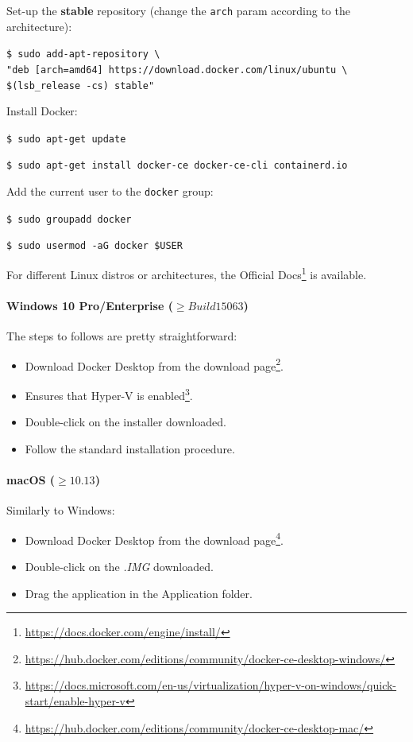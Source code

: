 \noindent Set-up the \textbf{stable} repository (change the \texttt{arch} param according to the architecture):

  \texttt{\$ sudo add-apt-repository \textbackslash} \\
  \indent \hspace{0.8cm} \texttt{"deb [arch=amd64] https://download.docker.com/linux/ubuntu \textbackslash} \\
  \indent \hspace{0.8cm} \texttt{\$(lsb\_release -cs) stable"}

\noindent Install Docker:

  \texttt{\$ sudo apt-get update}
  
  \texttt{\$ sudo apt-get install docker-ce docker-ce-cli containerd.io}

\noindent Add the current user to the \texttt{docker} group:
  
  \texttt{\$ sudo groupadd docker}
  
  \texttt{\$ sudo usermod -aG docker \$USER}

\noindent For different Linux distros or architectures, the Official Docs\footnote{\url{https://docs.docker.com/engine/install/}} is available.

\paragraph{Windows 10 Pro/Enterprise ($\geq Build 15063$)} The steps to follows are pretty straightforward:

\begin{itemize}
    \item[1.] Download Docker Desktop from the download page\footnote{\url{https://hub.docker.com/editions/community/docker-ce-desktop-windows/}}.
    \item[2.] Ensures that Hyper-V is enabled\footnote{\url{https://docs.microsoft.com/en-us/virtualization/hyper-v-on-windows/quick-start/enable-hyper-v}}.
    \item[3.] Double-click on the installer downloaded.
    \item[4.] Follow the standard installation procedure.
\end{itemize}

\paragraph{macOS ($\geq 10.13$)} Similarly to Windows:

\begin{itemize}
    \item[1.] Download Docker Desktop from the download page\footnote{\url{https://hub.docker.com/editions/community/docker-ce-desktop-mac/}}.
    \item[2.] Double-click on the \textit{.IMG} downloaded.
    \item[3.] Drag the application in the Application folder.
\end{itemize}


